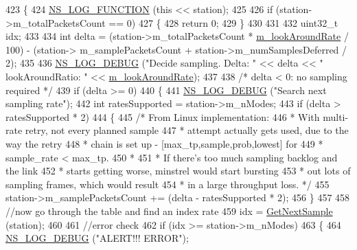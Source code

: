 \begin{DoxyCode}
423 \{
424   \hyperlink{log-macros-disabled_8h_a90b90d5bad1f39cb1b64923ea94c0761}{NS\_LOG\_FUNCTION} (\textcolor{keyword}{this} << station);
425 
426   \textcolor{keywordflow}{if} (station->m\_totalPacketsCount == 0)
427     \{
428       \textcolor{keywordflow}{return} 0;
429     \}
430 
431 
432   uint32\_t idx;
433 
434   \textcolor{keywordtype}{int} delta = (station->m\_totalPacketsCount * \hyperlink{classns3_1_1MinstrelWifiManager_aebf6e38fb43af62f59490829d46e0e1d}{m\_lookAroundRate} / 100) - (station->
      m\_samplePacketsCount + station->m\_numSamplesDeferred / 2);
435 
436   \hyperlink{group__logging_ga413f1886406d49f59a6a0a89b77b4d0a}{NS\_LOG\_DEBUG} (\textcolor{stringliteral}{"Decide sampling. Delta: "} << delta << \textcolor{stringliteral}{" lookAroundRatio: "} <<  
      \hyperlink{classns3_1_1MinstrelWifiManager_aebf6e38fb43af62f59490829d46e0e1d}{m\_lookAroundRate});
437 
438   \textcolor{comment}{/* delta < 0: no sampling required */}
439   \textcolor{keywordflow}{if} (delta >= 0)
440     \{
441       \hyperlink{group__logging_ga413f1886406d49f59a6a0a89b77b4d0a}{NS\_LOG\_DEBUG} (\textcolor{stringliteral}{"Search next sampling rate"});
442       \textcolor{keywordtype}{int} ratesSupported = station->m\_nModes;
443       \textcolor{keywordflow}{if} (delta > ratesSupported * 2)
444         \{
445           \textcolor{comment}{/* From Linux implementation:}
446 \textcolor{comment}{           * With multi-rate retry, not every planned sample}
447 \textcolor{comment}{           * attempt actually gets used, due to the way the retry}
448 \textcolor{comment}{           * chain is set up - [max\_tp,sample,prob,lowest] for}
449 \textcolor{comment}{           * sample\_rate < max\_tp.}
450 \textcolor{comment}{           *}
451 \textcolor{comment}{           * If there's too much sampling backlog and the link}
452 \textcolor{comment}{           * starts getting worse, minstrel would start bursting}
453 \textcolor{comment}{           * out lots of sampling frames, which would result}
454 \textcolor{comment}{           * in a large throughput loss. */}
455           station->m\_samplePacketsCount += (delta - ratesSupported * 2);
456         \}
457 
458       \textcolor{comment}{//now go through the table and find an index rate}
459       idx = \hyperlink{classns3_1_1MinstrelWifiManager_a9dd13d606ef45228fd9d69f5f1aec6cc}{GetNextSample} (station);
460 
461       \textcolor{comment}{//error check}
462       \textcolor{keywordflow}{if} (idx >= station->m\_nModes)
463         \{
464           \hyperlink{group__logging_ga413f1886406d49f59a6a0a89b77b4d0a}{NS\_LOG\_DEBUG} (\textcolor{stringliteral}{"ALERT!!! ERROR"});

\end{DoxyCode}
